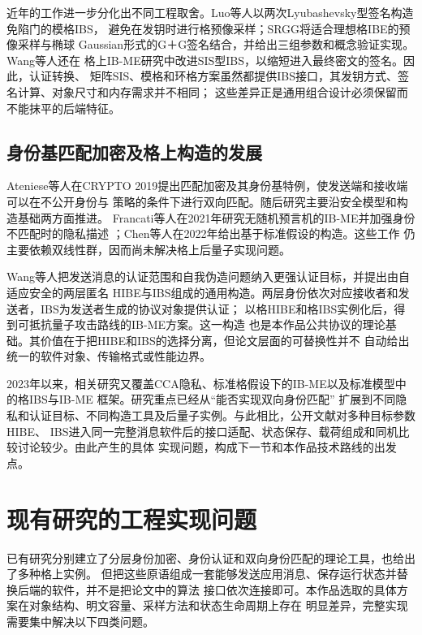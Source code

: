 近年的工作进一步分化出不同工程取舍。Luo等人以两次Lyubashevsky型签名构造免陷门的模格IBS，
避免在发钥时进行格预像采样\cite{luo2024ibs}；SRGG将适合理想格IBE的预像采样与椭球
Gaussian形式的G＋G签名结合，并给出三组参数和概念验证实现\cite{jia2025ibs}。Wang等人还在
格上IB-ME研究中改进SIS型IBS，以缩短进入最终密文的签名\cite{wang2024ibme}。因此，认证转换、
矩阵SIS、模格和环格方案虽然都提供IBS接口，其发钥方式、签名计算、对象尺寸和内存需求并不相同；
这些差异正是通用组合设计必须保留而不能抹平的后端特征。

\subsection{身份基匹配加密及格上构造的发展}

Ateniese等人在CRYPTO 2019提出匹配加密及其身份基特例，使发送端和接收端可以在不公开身份与
策略的条件下进行双向匹配\cite{ateniese2019me}。随后研究主要沿安全模型和构造基础两方面推进。
Francati等人在2021年研究无随机预言机的IB-ME并加强身份不匹配时的隐私描述
\cite{francati2021ibme}；Chen等人在2022年给出基于标准假设的构造\cite{chen2022ibme}。这些工作
仍主要依赖双线性群，因而尚未解决格上后量子实现问题。

Wang等人把发送消息的认证范围和自我伪造问题纳入更强认证目标，并提出由自适应安全的两层匿名
HIBE与IBS组成的通用构造。两层身份依次对应接收者和发送者，IBS为发送者生成的协议对象提供认证；
以格HIBE和格IBS实例化后，得到可抵抗量子攻击路线的IB-ME方案\cite{wang2024ibme}。这一构造
也是本作品公共协议的理论基础。其价值在于把HIBE和IBS的选择分离，但论文层面的可替换性并不
自动给出统一的软件对象、传输格式或性能边界。

2023年以来，相关研究又覆盖CCA隐私、标准格假设下的IB-ME以及标准模型中的格IBS与IB-ME
框架\cite{chiku2023ibme,belfiore2024ibme,yu2026ibme}。研究重点已经从“能否实现双向身份匹配”
扩展到不同隐私和认证目标、不同构造工具及后量子实例。与此相比，公开文献对多种目标参数HIBE、
IBS进入同一完整消息软件后的接口适配、状态保存、载荷组成和同机比较讨论较少。由此产生的具体
实现问题，构成下一节和本作品技术路线的出发点。

\section{现有研究的工程实现问题}

已有研究分别建立了分层身份加密、身份认证和双向身份匹配的理论工具，也给出了多种格上实例。
但把这些原语组成一套能够发送应用消息、保存运行状态并替换后端的软件，并不是把论文中的算法
接口依次连接即可。本作品选取的具体方案在对象结构、明文容量、采样方法和状态生命周期上存在
明显差异，完整实现需要集中解决以下四类问题。

